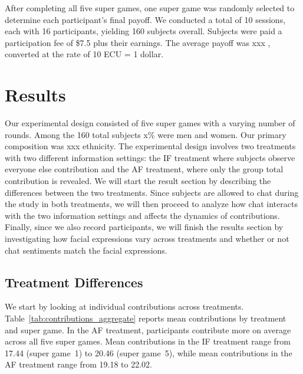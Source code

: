 \documentclass[12pt,letterpaper,english]{article}
\begin{document}
After completing all five super games, one super game was randomly selected to determine each participant’s final payoff. We conducted a total of 10 sessions, each with 16 participants, yielding 160 subjects overall. Subjects were paid a participation fee of \$7.5 plus their earnings. The average payoff was xxx , converted at the rate of 10 ECU = 1 dollar.


\section{Results}



Our experimental design consisted of five super games with a varying number of rounds. Among the 160 total subjects x\% were men and women. Our primary composition was xxx ethnicity. The experimental design involves two treatments with two different information settings: the IF treatment where subjects observe everyone else contribution and the AF treatment, where only the group total contribution is revealed. We will start the result section by describing the differences between the two treatments. Since subjects are allowed to chat during the study in both treatments, we will then proceed to analyze how chat interacts with the two information settings and affects the dynamics of contributions. Finally, since we also record  participants, we will finish the results section by investigating how facial expressions vary across treatments and whether or not chat sentiments match the facial expressions.

\subsection{Treatment Differences}

We start by looking at individual contributions across treatments. Table~\ref{tab:contributions_aggregate} reports mean contributions by treatment and super game. In the AF treatment, participants contribute more on average across all five super games. Mean contributions in the IF treatment range from 17.44 (super game~1) to 20.46 (super game~5), while mean contributions in the AF treatment range from 19.18 to 22.02. 

	\begin{table}[H]
		\centering
		\caption{Contribution Summary Statistics by Treatment and Supergame}
		\label{tab:contributions_aggregate}
		
	\end{table} 
\end{document}
